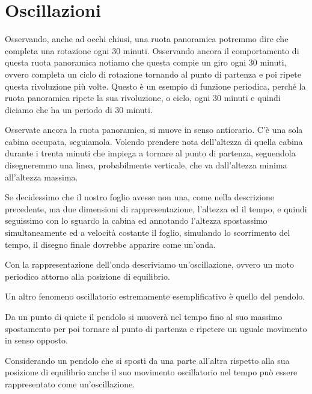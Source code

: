 
\section{Oscillazioni}

Osservando, anche ad occhi chiusi, una ruota panoramica potremmo dire che
completa una rotazione ogni 30 minuti. Osservando ancora il comportamento di
questa ruota panoramica notiamo che questa compie un giro ogni 30 minuti,
ovvero completa un ciclo di rotazione tornando al punto di partenza e poi
ripete questa rivoluzione più volte. Questo è un esempio di funzione periodica,
perché la ruota panoramica ripete la sua rivoluzione, o ciclo, ogni 30 minuti
e quindi diciamo che ha un periodo di 30 minuti.



Osservate ancora la ruota panoramica, si muove in senso antiorario. C'è una
sola cabina occupata, seguiamola. Volendo prendere nota dell'altezza di quella
cabina durante i trenta minuti che impiega a tornare al punto di partenza,
seguendola disegneremmo una linea, probabilmente verticale, che va dall'altezza
minima all'altezza massima.



Se decidessimo che il nostro foglio avesse non una, come nella descrizione
precedente, ma due dimensioni di rappresentazione, l'altezza ed il tempo, e
quindi seguissimo con lo sguardo la cabina ed annotando l'altezza spostassimo
simultaneamente ed a velocità costante il foglio, simulando lo scorrimento del
tempo, il disegno finale dovrebbe apparire come un'onda.



Con la rappresentazione dell'onda descriviamo un'oscillazione, ovvero un moto
periodico attorno alla posizione di equilibrio.

Un altro fenomeno oscillatorio estremamente esemplificativo è quello del pendolo.

Da un punto di quiete il pendolo si muoverà nel tempo fino al suo massimo
spostamento per poi tornare al punto di partenza e ripetere un uguale movimento
in senso opposto.

Considerando un pendolo che si sposti da una parte all'altra rispetto alla sua
posizione di equilibrio anche il suo movimento oscillatorio nel tempo può essere
rappresentato come un'oscillazione.

